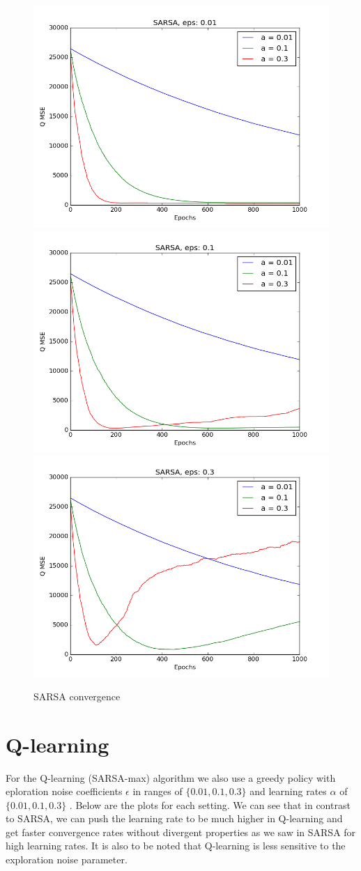\documentclass[11pt]{article}
\begin{document}
\begin{figure}[htp]

\centering
\includegraphics[width=.33\textwidth]{sarsaeps001}\hfill
\includegraphics[width=.33\textwidth]{sarsaeps01}\hfill
\includegraphics[width=.33\textwidth]{sarsaeps03}

\caption{SARSA convergence}
\label{fig:figure3}

\end{figure}

\section{Q-learning}
For the Q-learning (SARSA-max) algorithm we also use a greedy policy with eploration noise coefficients $\epsilon$ in ranges of $\{ 0.01, 0.1, 0.3\}$ and learning rates $\alpha$ of $\{ 0.01, 0.1, 0.3\}$ . Below are the plots for each setting. We can see that in contrast to SARSA, we can push the learning rate to be much higher in Q-learning and get faster convergence rates without divergent properties as we saw in SARSA for high learning rates. It is also to be noted that Q-learning is less sensitive to the exploration noise parameter.
\end{document}
